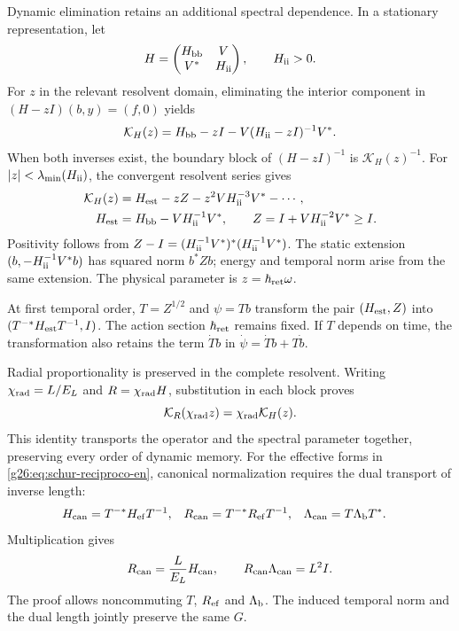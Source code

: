 Dynamic elimination retains an additional spectral dependence. In a
stationary representation, let
\[
 H=\begin{pmatrix}H_{\rm bb}&V\\V^*&H_{\rm ii}\end{pmatrix},
 \qquad H_{\rm ii}>0.
\]
For \(z\) in the relevant resolvent domain, eliminating the interior
component in \((H-zI)(b,y)=(f,0)\) yields
\begin{equation}
 \mathcal K_H(z)=H_{\rm bb}-zI
       -V(H_{\rm ii}-zI)^{-1}V^*.
 \label{g26:eq:resolvente-memoria-en}
\end{equation}
When both inverses exist, the boundary block of \((H-zI)^{-1}\)
is \(\mathcal K_H(z)^{-1}\). For
\(|z|<\lambda_{\min}(H_{\rm ii})\), the convergent resolvent
series gives
\begin{align}
 \mathcal K_H(z)&=H_{\rm est}-zZ-z^2VH_{\rm ii}^{-3}V^*-\cdots,
 \label{g26:eq:expansion-resolvente-en}\\
 H_{\rm est}&=H_{\rm bb}-VH_{\rm ii}^{-1}V^*,\qquad
 Z=I+VH_{\rm ii}^{-2}V^*\geq I.
 \label{g26:eq:norma-z-en}
\end{align}
Positivity follows from
\(Z-I=(H_{\rm ii}^{-1}V^*)^*(H_{\rm ii}^{-1}V^*)\).
The static extension \((b,-H_{\rm ii}^{-1}V^*b)\) has squared
norm \(b^*Zb\); energy and temporal norm arise from the same
extension. The physical parameter is
\(z=\hbar_{\rm ret}\omega\).

At first temporal order, \(T=Z^{1/2}\) and \(\psi=Tb\)
transform the pair \((H_{\rm est},Z)\) into
\((T^{-*}H_{\rm est}T^{-1},I)\). The action section
\(\hbar_{\rm ret}\) remains fixed. If \(T\) depends on time,
the transformation also retains the term \(\dot T b\) in
\(\dot\psi=\dot T b+T\dot b\).

Radial proportionality is preserved in the complete resolvent.
Writing \(\chi_{\rm rad}=L/E_{L}\) and \(R=\chi_{\rm rad} H\), substitution in
each block proves
\begin{equation}
 \mathcal K_R(\chi_{\rm rad} z)=\chi_{\rm rad}\mathcal K_H(z).
 \label{g26:eq:resolvente-proporcional-en}
\end{equation}
This identity transports the operator and the spectral parameter
together, preserving every order of dynamic memory. For the effective
forms in \eqref{g26:eq:schur-reciproco-en}, canonical normalization
requires the dual transport of inverse length:
\begin{align*}
 H_{\rm can}&=T^{-*}H_{\rm ef}T^{-1},&
 R_{\rm can}&=T^{-*}R_{\rm ef}T^{-1},&
 \Lambda_{\rm can}&=T\Lambda_{\rm b}T^*.
\end{align*}
Multiplication gives
\[
 R_{\rm can}=\frac{L}{E_{L}}H_{\rm can},\qquad
 R_{\rm can}\Lambda_{\rm can}=L^2I.
\]
The proof allows noncommuting \(T\), \(R_{\rm ef}\) and
\(\Lambda_{\rm b}\). The induced temporal norm and the dual
length jointly preserve the same \(G\).

